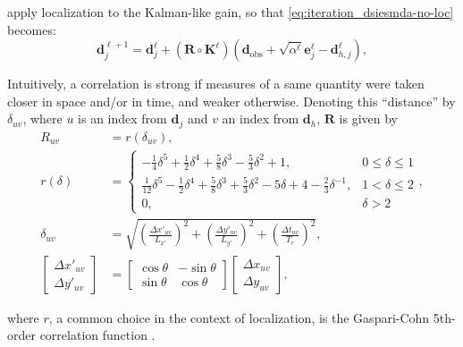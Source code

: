  apply localization to the Kalman-like gain,
so that \cref{eq:iteration_dsiesmda-no-loc} becomes:
%
\begin{equation}
    \mathbf{d}_j^{\ell+1} 
    =
    \mathbf{d}_j^\ell + (\mathbf{R}\circ\mathbf{K}^\ell)
    (\mathbf{d}_\text{obs} + \sqrt{\alpha^\ell}\mathbf{e}_j^\ell - \mathbf{d}_{h, j}^\ell),
\label{eq:iteration_dsiesmda}
\end{equation}

Intuitively, a correlation is strong if measures of a same quantity were taken closer in space and/or in time, and weaker otherwise. 
Denoting this ``distance'' by $\delta_{uv}$, 
where $u$ is an index from $\mathbf{d}_j$ and 
$v$ an index from $\mathbf{d}_h$, 
$\mathbf{R}$ is given by
%
\begin{align}
    R_{uv} &= r(\delta_{uv}), 
    \\
    r(\delta) &= \begin{cases}
        -\frac{1}{4}\delta^5 + \frac{1}{2}\delta^4 + \frac{5}{8}\delta^3 -\frac{5}{3}\delta^2 + 1,
        & 0 \leq \delta \leq 1 \\
        \frac{1}{12}\delta^5 - \frac{1}{2}\delta^4 + \frac{5}{8}\delta^3 +\frac{5}{3}\delta^2 -5\delta + 4 - \frac{2}{3}\delta^{-1},
        & 1 < \delta \leq 2 \\
        0,
        & \delta > 2 
    \end{cases},
    \\
    \delta_{uv} &= 
    \sqrt{
        \left(\frac{\Delta x'_{uv}}{L_{x'}}\right)^2 + 
        \left(\frac{\Delta y'_{uv}}{L_{y'}}\right)^2 + 
        \left(\frac{\Delta t_{uv}}{T_c}\right)^2
    }, \\
    \begin{bmatrix}
        \Delta x'_{uv} \\ \Delta y'_{uv}
    \end{bmatrix}
    &= 
    \begin{bmatrix}
        \cos\theta & -\sin\theta \\ 
        \sin\theta & \cos\theta
    \end{bmatrix}
    \begin{bmatrix}
        \Delta x_{uv} \\ \Delta y_{uv}
    \end{bmatrix},
\end{align}

where $r$, a common choice in the context of localization, 
is the Gaspari-Cohn 5th-order correlation function 
\cite{Gaspari:1999}.

